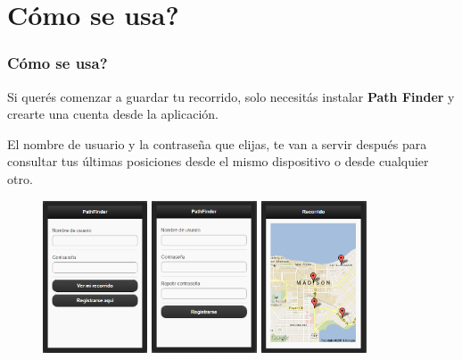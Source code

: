 \section{C\'omo se usa?}

\begin{frame}
\frametitle{C\'omo se usa?}

Si quer\'es comenzar a guardar tu recorrido, solo necesit\'as instalar \textbf{Path Finder} y crearte una cuenta desde la aplicaci\'on.

\pause
El nombre de usuario y la contrase\~na que elijas, te van a servir despu\'es para consultar tus \'ultimas posiciones desde el mismo dispositivo o desde cualquier otro.

\begin{figure}
	\begin{center}
	  \pause
	  \includegraphics[height=4.5cm]{imagenes/1.png}
	  \hspace{1mm}
	  \pause
	  \includegraphics[height=4.5cm]{imagenes/2.png}
	  \hspace{1mm}
	  \pause
	  \includegraphics[height=4.5cm]{imagenes/3.png}
	  \hspace{1mm}
	\end{center}
\end{figure}

\end{frame}
